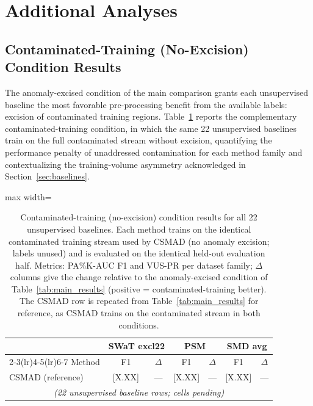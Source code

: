
\section{Additional Analyses}
\label{sec:appendix_additional}

\subsection{Contaminated-Training (No-Excision) Condition Results}
\label{sec:contaminated_results}

The anomaly-excised condition of the main comparison grants each unsupervised baseline the most
favorable pre-processing benefit from the available labels: excision of contaminated training
regions.
Table~\ref{tab:contaminated} reports the complementary contaminated-training condition, in which
the same 22 unsupervised baselines train on the full contaminated stream without excision,
quantifying the performance penalty of unaddressed contamination for each method family and
contextualizing the training-volume asymmetry acknowledged in Section~\ref{sec:baselines}.

\begin{table}[tp]
\footnotesize
\centering
\caption{Contaminated-training (no-excision) condition results for all 22 unsupervised
  baselines. Each method trains on the identical contaminated training stream used by CSMAD
  (no anomaly excision; labels unused) and is evaluated on the identical held-out evaluation
  half. Metrics: PA\%K-AUC F1 and VUS-PR per dataset family; $\Delta$ columns give the change
  relative to the anomaly-excised condition of Table~\ref{tab:main_results} (positive =
  contaminated-training better). The CSMAD row is repeated from Table~\ref{tab:main_results}
  for reference, as CSMAD trains on the contaminated stream in both conditions.}
\label{tab:contaminated}
\begin{adjustbox}{max width=\linewidth}
\begin{tabular}{lcccccc}
\toprule
& \multicolumn{2}{c}{SWaT excl22} & \multicolumn{2}{c}{PSM} & \multicolumn{2}{c}{SMD avg} \\
\cmidrule(lr){2-3}\cmidrule(lr){4-5}\cmidrule(lr){6-7}
Method & F1 & $\Delta$ & F1 & $\Delta$ & F1 & $\Delta$ \\
\midrule
CSMAD (reference) & {[X.XX]} & --- & {[X.XX]} & --- & {[X.XX]} & --- \\
\multicolumn{7}{c}{\textit{(22 unsupervised baseline rows; cells pending)}} \\
\bottomrule
\end{tabular}
\end{adjustbox}
\end{table}

